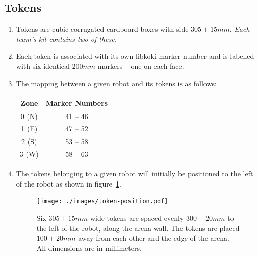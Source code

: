 \subsection{Tokens}
\label{sub:Tokens}
\begin{enumerate}
\item Tokens are cubic corrugated cardboard boxes with side $305 \pm 15 mm$.
      \emph{Each team's kit contains two of these.}

\item Each token is associated with its own libkoki marker number and is labelled with six identical $200mm$ markers -- one on each face.

\item The mapping between a given robot and its tokens is as follows:

\begin{center}
  \begin{tabular}{cc}
    \toprule
    \textbf{Zone} & \textbf{Marker Numbers} \\
    \midrule
    0 (N) & 41 -- 46 \\
    1 (E) & 47 -- 52 \\
    2 (S) & 53 -- 58 \\
    3 (W) & 58 -- 63 \\
    \bottomrule
  \end{tabular}
\end{center}

\item The tokens belonging to a given robot will initially be positioned to the left of the robot as shown in figure~\ref{fig:token-position}.

\begin{figure}
  \centering
  \texttt{[image: ./images/token-position.pdf]}
  \caption{Six $305 \pm 15mm$ wide tokens are spaced evenly $300 \pm 20mm$ to the left of the robot, along the arena wall.
           The tokens are placed $100 \pm 20mm$ away from each other and the edge of the arena.
           All dimensions are in millimeters.}
  \label{fig:token-position}
\end{figure}

\end{enumerate}

\clearpage
